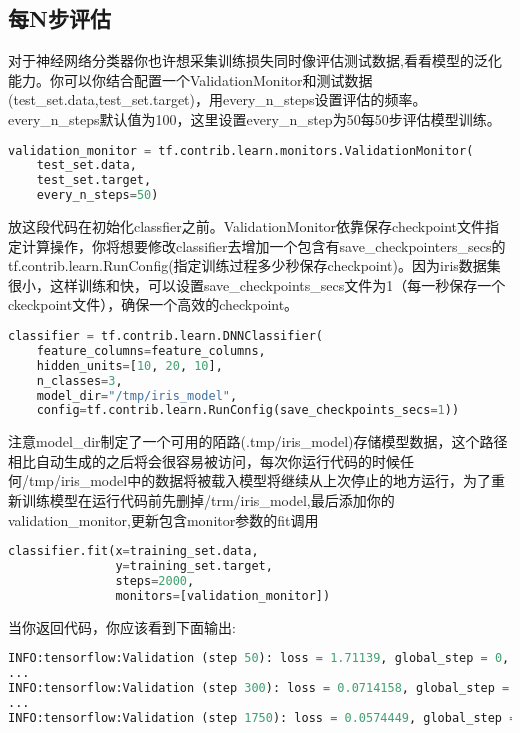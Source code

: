 \subsection{每N步评估}
对于神经网络分类器你也许想采集训练损失同时像评估测试数据,看看模型的泛化能力。你可以你结合配置一个ValidationMonitor和测试数据(test\_set.data,test\_set.target)，用every\_n\_steps设置评估的频率。every\_n\_steps默认值为100，这里设置every\_n\_step为50每50步评估模型训练。
\begin{lstlisting}[language=Python]
validation_monitor = tf.contrib.learn.monitors.ValidationMonitor(
    test_set.data,
    test_set.target,
    every_n_steps=50)
\end{lstlisting}
放这段代码在初始化classfier之前。ValidationMonitor依靠保存checkpoint文件指定计算操作，你将想要修改classifier去增加一个包含有save\_checkpointers\_secs的tf.contrib.learn.RunConfig(指定训练过程多少秒保存checkpoint)。因为iris数据集很小，这样训练和快，可以设置save\_checkpoints\_secs文件为1（每一秒保存一个ckeckpoint文件），确保一个高效的checkpoint。
\begin{lstlisting}[language=Python]
classifier = tf.contrib.learn.DNNClassifier(
    feature_columns=feature_columns,
    hidden_units=[10, 20, 10],
    n_classes=3,
    model_dir="/tmp/iris_model",
    config=tf.contrib.learn.RunConfig(save_checkpoints_secs=1))
\end{lstlisting}
注意model\_dir制定了一个可用的陌路(.tmp/iris\_model)存储模型数据，这个路径相比自动生成的之后将会很容易被访问，每次你运行代码的时候任何/tmp/iris\_model中的数据将被载入模型将继续从上次停止的地方运行，为了重新训练模型在运行代码前先删掉/trm/iris\_model,最后添加你的validation\_monitor,更新包含monitor参数的fit调用
\begin{lstlisting}[language=Python]
classifier.fit(x=training_set.data,
               y=training_set.target,
               steps=2000,
               monitors=[validation_monitor])
\end{lstlisting}
当你返回代码，你应该看到下面输出:
\begin{lstlisting}[language=Python]
INFO:tensorflow:Validation (step 50): loss = 1.71139, global_step = 0, accuracy = 0.266667
...
INFO:tensorflow:Validation (step 300): loss = 0.0714158, global_step = 268, accuracy = 0.966667
...
INFO:tensorflow:Validation (step 1750): loss = 0.0574449, global_step = 1729, accuracy = 0.966667
\end{lstlisting}
